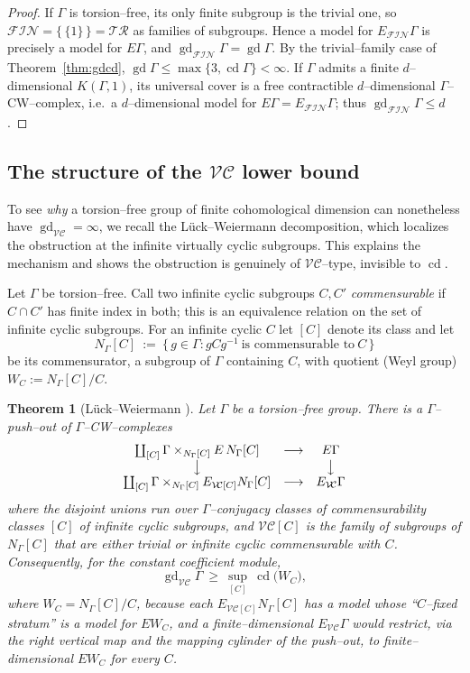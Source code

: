 \documentclass{amsart}
\newtheorem{theorem}{Theorem}
\theoremstyle{definition}
\newcommand{\FIN}{\mathcal{F\!I\!N}}
\newcommand{\VC}{\mathcal{V\!C}}
\newcommand{\gd}{\operatorname{gd}}
\newcommand{\cd}{\operatorname{cd}}
\begin{document}
\begin{proof}
If $\Gamma$ is torsion--free, its only finite subgroup is the trivial one, so
$\FIN=\{\,\{1\}\,\}=\mathcal{TR}$ as families of subgroups. Hence a model for $E_{\FIN}\Gamma$
is precisely a model for $E\Gamma$, and $\gd_{\FIN}\Gamma=\gd\Gamma$. By the trivial--family
case of Theorem~\ref{thm:gdcd}, $\gd\Gamma\le\max\{3,\cd\Gamma\}<\infty$. If $\Gamma$ admits a
finite $d$--dimensional $K(\Gamma,1)$, its universal cover is a free contractible
$d$--dimensional $\Gamma$--CW--complex, i.e.\ a $d$--dimensional model for
$E\Gamma=E_{\FIN}\Gamma$; thus $\gd_{\FIN}\Gamma\le d$.
\end{proof}

\subsection{The structure of the $\VC$ lower bound}

To see \emph{why} a torsion--free group of finite cohomological dimension can nonetheless have
$\gd_{\VC}=\infty$, we recall the Lück--Weiermann decomposition, which localizes the
obstruction at the infinite virtually cyclic subgroups. This explains the mechanism and shows
the obstruction is genuinely of $\VC$--type, invisible to $\cd$.

Let $\Gamma$ be torsion--free. Call two infinite cyclic subgroups $C,C'$ \emph{commensurable}
if $C\cap C'$ has finite index in both; this is an equivalence relation on the set of infinite
cyclic subgroups. For an infinite cyclic $C$ let $[C]$ denote its class and let
\[
N_\Gamma[C]\ :=\ \{\,g\in\Gamma : g C g^{-1}\ \text{is commensurable to}\ C\,\}
\]
be its commensurator, a subgroup of $\Gamma$ containing $C$, with quotient (Weyl group)
$W_C:=N_\Gamma[C]/C$.

\begin{theorem}[Lück--Weiermann {\cite[Cor.~2.11, \S 5]{LueckWeiermann}}]\label{thm:LW}
Let $\Gamma$ be a torsion--free group. There is a $\Gamma$--push--out of
$\Gamma$--CW--complexes
\[
\begin{array}{ccc}
\coprod_{[C]} \Gamma\times_{N_\Gamma[C]} E\,N_\Gamma[C] & \longrightarrow & E\Gamma\\
\big\downarrow & & \big\downarrow\\
\coprod_{[C]} \Gamma\times_{N_\Gamma[C]} E_{\VC[C]}N_\Gamma[C] & \longrightarrow & E_{\VC}\Gamma
\end{array}
\]
where the disjoint unions run over $\Gamma$--conjugacy classes of commensurability classes
$[C]$ of infinite cyclic subgroups, and $\VC[C]$ is the family of subgroups of $N_\Gamma[C]$
that are either trivial or infinite cyclic commensurable with $C$. Consequently, for the
constant coefficient module,
\[
\gd_{\VC}\Gamma\ \ge\ \sup_{[C]}\ \cd\bigl(W_C\bigr),
\]
where $W_C=N_\Gamma[C]/C$, because each $E_{\VC[C]}N_\Gamma[C]$ has a model whose ``$C$--fixed
stratum'' is a model for $E W_C$, and a finite--dimensional $E_{\VC}\Gamma$ would restrict, via
the right vertical map and the mapping cylinder of the push--out, to finite--dimensional
$E W_C$ for every $C$.
\end{theorem}
\end{document}
